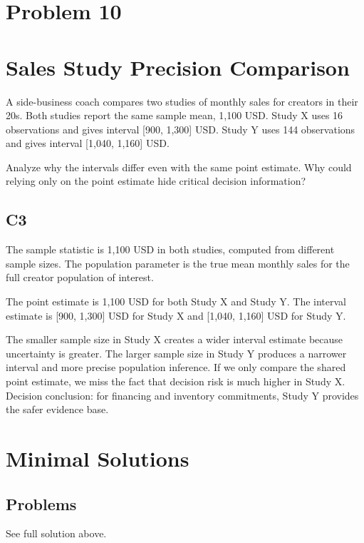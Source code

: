 \begin{ExamProblems}
		\newpage
		\item
		\section{Problem 10}
		\section{Sales Study Precision Comparison}
		A side-business coach compares two studies of monthly sales for creators in their 20s.
		Both studies report the same sample mean, 1,100 USD.
		Study X uses 16 observations and gives interval [900, 1,300] USD.
		Study Y uses 144 observations and gives interval [1,040, 1,160] USD.

		Analyze why the intervals differ even with the same point estimate.
		Why could relying only on the point estimate hide critical decision information?

		\subsection*{C3}
		The sample statistic is 1,100 USD in both studies, computed from different sample sizes.
		The population parameter is the true mean monthly sales for the full creator population of interest.

		The point estimate is 1,100 USD for both Study X and Study Y.
		The interval estimate is [900, 1,300] USD for Study X and [1,040, 1,160] USD for Study Y.

		The smaller sample size in Study X creates a wider interval estimate because uncertainty is greater.
		The larger sample size in Study Y produces a narrower interval and more precise population inference.
		If we only compare the shared point estimate, we miss the fact that decision risk is much higher in Study X.
		Decision conclusion: for financing and inventory commitments, Study Y provides the safer evidence base.

	\end{ExamProblems}


\section{Minimal Solutions}

\subsection*{Problems}
See full solution above.

